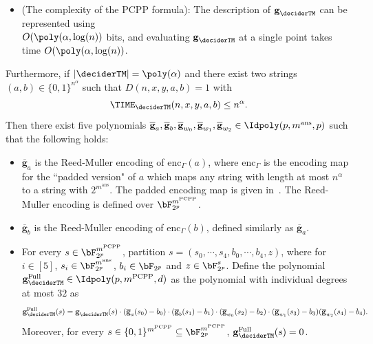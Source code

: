 \begin{theorem}
\begin{itemize}
	\item (The complexity of the PCPP formula): The description of $\textbf{g}_{\deciderTM}$ can be represented using \\ $O(\poly(\alpha, \log(n))$ bits, and evaluating $\textbf{g}_{\deciderTM}$ at a single point takes time $O(\poly(\alpha, \log(n))$. 
\end{itemize}
Furthermore, if $|\deciderTM| = \poly(\alpha)$ and there exist two strings $(a,b) \in \{0,1\}^{n^{\alpha}}$ such that $D(n,x,y,a,b) = 1$ with
\begin{equation*}
	\TIME_{ \deciderTM}(n,x,y,a,b) \leq n^{\alpha}. 
\end{equation*}
Then there exist five polynomials $\overline{\textbf{g}}_a, \overline{\textbf{g}}_b,\overline{\textbf{g}}_{w_0}, \overline{\textbf{g}}_{w_1},\overline{\textbf{g}}_{w_2} \in \Idpoly(p, m^{\text{ans}},p)$ such that the following holds:
\begin{itemize}
	\item $\overline{\textbf{g}}_a$ is the Reed-Muller encoding of $\text{enc}_{\Gamma}(a)$, where $\text{enc}_{\Gamma}$ is the encoding map for the ``padded  version" of $a$ which maps any string with length at most $n^{\alpha}$ to a string with $2^{ m^{\text{ans}}}$. The padded encoding map is given in~\cite[Proposition 10.19]{jiMIPRE2022a}. The Reed-Muller encoding is defined over $\bF_{2^p}^{m^{\text{PCPP}}}$. 
	\item $\overline{\textbf{g}}_b$ is the Reed-Muller encoding of $\text{enc}_{\Gamma}(b)$, defined similarly as $\overline{\textbf{g}}_a$. 
	\item  For every $s \in \bF_{2^p}^{m^{\text{PCPP}}}$, partition $s =(s_0, \cdots, s_4, b_0, \cdots, b_4, z)$, where for $i \in [5]$, $s_i \in \bF_{2^p}^{m^{\text{ans}}}$,  $b_i \in \bF_{2^p}$ and $z \in \bF_{2^p}^s$. Define the polynomial $\textbf{g}_{\deciderTM}^{\text{Full}}  \in \Idpoly(p,m^{\text{PCPP}},d)$ as the polynomial with individual degrees at most $32$ as 
	\begin{equation} \label{eq:PCPPpolycondition}
		\textbf{g}_{\deciderTM}^{\text{Full}}(s) = \textbf{g}_{\deciderTM}(s) \cdot (\overline{\textbf{g}}_a(s_0) - b_0) \cdot (\overline{\textbf{g}}_b(s_1) - b_1)  \cdot (\overline{\textbf{g}}_{w_0}(s_2) - b_2) \cdot (\overline{\textbf{g}}_{w_1}(s_3) - b_3) (\overline{\textbf{g}}_{w_2}(s_4) - b_4). 
	\end{equation}
	Moreover, for every $s \in \{0,1\}^{m^{\text{PCPP}}} \subseteq \bF_{2^p}^{m^{\text{PCPP}}}$, $\textbf{g}_{\deciderTM}^{\text{Full}}(s)= 0$. 
\end{itemize}
\end{theorem}
